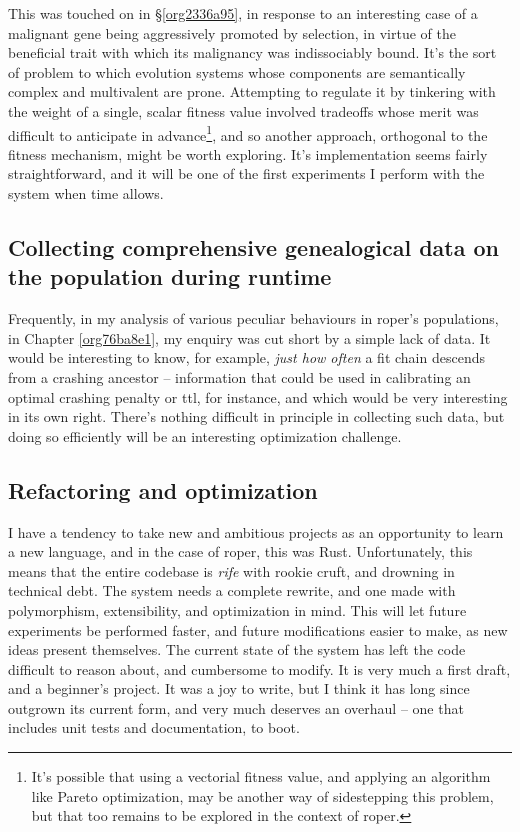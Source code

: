\documentclass[12pt,glossary]{dalthesis}
\begin{document}
This was touched on in \S \ref{org2336a95}, in response to an interesting case
of a malignant gene being aggressively promoted by selection, in virtue of the
beneficial trait with which its malignancy was indissociably bound. It's the
sort of problem to which evolution systems whose components are semantically
complex and multivalent are prone. Attempting to regulate it by tinkering with
the weight of a single, scalar fitness value involved tradeoffs whose merit was
difficult to anticipate in advance\footnote{It's possible that using a vectorial fitness value, and applying an algorithm
  like Pareto optimization, may be another way of sidestepping this problem, but
  that too remains to be explored in the context of \gls{roper}.}, and so another approach, orthogonal to the fitness mechanism, might be worth
exploring. It's implementation seems fairly straightforward, and it will be one
of the first experiments I perform with the system when time allows. 

\subsection{Collecting comprehensive genealogical data on the population during runtime}
\label{sec:org5113ced}

Frequently, in my analysis of various peculiar behaviours in \gls{roper}'s
populations, in Chapter \ref{org76ba8e1}, my enquiry was cut short by a simple
lack of data. It would be interesting to know, for example, \emph{just how often} a
fit chain descends from a crashing ancestor -- information that could be used in
calibrating an optimal crashing penalty or \gls{ttl}, for instance, and which would
be very interesting in its own right. There's nothing difficult in principle in
collecting such data, but doing so efficiently will be an interesting optimization
challenge. 

\subsection{Refactoring and optimization}
\label{sec:org58f3048}

I have a tendency to take new and ambitious projects as an opportunity to learn
a new language, and in the case of \gls{roper}, this was Rust. Unfortunately, this
means that the entire codebase is \emph{rife} with rookie cruft, and drowning in 
technical debt. The system needs a complete rewrite, and one made with polymorphism,
extensibility, and optimization in mind. This will let future experiments be 
performed faster, and future modifications easier to make, as new ideas present
themselves. The current state of the system has left the code difficult to reason
about, and cumbersome to modify. It is very much a first draft, and a beginner's
project. It was a joy to write, but I think it has long since outgrown its current
form, and very much deserves an overhaul -- one that includes unit tests and
documentation, to boot. 
\end{document}
